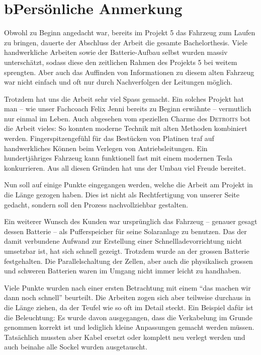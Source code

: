 \chapter*{b\quad Persönliche Anmerkung}
Obwohl zu Beginn angedacht war, bereits im Projekt 5 das Fahrzeug zum Laufen zu bringen, dauerte der Abschluss der Arbeit die gesamte Bachelorthesis. Viele handwerkliche Arbeiten sowie der Batterie-Aufbau selbst wurden massiv unterschätzt, sodass diese den zeitlichen Rahmen des Projekts 5 bei weitem sprengten. Aber auch das Auffinden von Informationen zu diesem alten Fahrzeug war nicht einfach und oft nur durch Nachverfolgen der Leitungen möglich.

Trotzdem hat uns die Arbeit sehr viel Spass gemacht. Ein solches Projekt hat man -- wie unser Fachcoach Felix Jenni bereits zu Beginn erwähnte -- vermutlich nur einmal im Leben. Auch abgesehen vom speziellen Charme des \textsc{Detroits} bot die Arbeit vieles: So konnten moderne Technik mit alten Methoden kombiniert werden. Fingerspitzengefühl für das Bestücken von Platinen traf auf handwerkliches Können beim Verlegen von Antriebsleitungen. Ein hundertjähriges Fahrzeug kann funktionell fast mit einem modernen Tesla konkurrieren. Aus all diesen Gründen hat uns der Umbau viel Freude bereitet.

Nun soll auf einige Punkte eingegangen werden, welche die Arbeit am Projekt in die Länge gezogen haben. Dies ist nicht als Rechtfertigung von unserer Seite gedacht, sondern soll den Prozess nachvollziehbar gestalten.

Ein weiterer Wunsch des Kunden war ursprünglich das Fahrzeug -- genauer gesagt dessen Batterie -- als Pufferspeicher für seine Solaranlage zu benutzen. Das der damit verbundene Aufwand zur Erstellung einer Schnellladevorrichtung nicht umsetzbar ist, hat sich schnell gezeigt. Trotzdem wurde an der grossen Batterie festgehalten. Die Parallelschaltung der Zellen, aber auch die physikalisch grossen und schweren Batterien waren im Umgang nicht immer leicht zu handhaben.

Viele Punkte wurden nach einer ersten Betrachtung mit einem "`das machen wir dann noch schnell"' beurteilt. Die Arbeiten zogen sich aber teilweise durchaus in die Länge ziehen, da der Teufel wie so oft im Detail steckt. Ein Beispiel dafür ist die Beleuchtung: Es wurde davon ausgegangen, dass die Verkabelung im Grunde genommen korrekt ist und lediglich kleine Anpassungen gemacht werden müssen. Tatsächlich mussten aber Kabel ersetzt oder komplett neu verlegt werden und auch beinahe alle Sockel wurden ausgetauscht.

